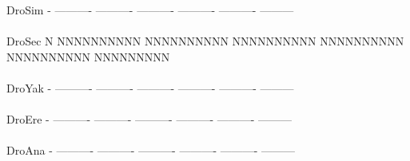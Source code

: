 \documentclass[11pt,twoside,reqno,a4paper]{article}
\begin{document}
{DroSim	-	----------	----------	----------	----------	----------	---------\\
\hspace*{7\charwidth}\hspace*{1\charwidth}\hspace*{1\charwidth}\hspace*{1\charwidth}\hspace*{1\charwidth}\hspace*{1\charwidth}\hspace*{1\charwidth}\\
DroSec	N	NNNNNNNNNN	NNNNNNNNNN	NNNNNNNNNN	NNNNNNNNNN	NNNNNNNNNN	NNNNNNNNN\\
\hspace*{7\charwidth}\hspace*{1\charwidth}\hspace*{1\charwidth}\hspace*{1\charwidth}\hspace*{1\charwidth}\hspace*{1\charwidth}\hspace*{1\charwidth}\\
DroYak	-	----------	----------	----------	----------	----------	---------\\
\hspace*{7\charwidth}\hspace*{1\charwidth}\hspace*{1\charwidth}\hspace*{1\charwidth}\hspace*{1\charwidth}\hspace*{1\charwidth}\hspace*{1\charwidth}\\
DroEre	-	----------	----------	----------	----------	----------	---------\\
\hspace*{7\charwidth}\hspace*{1\charwidth}\hspace*{1\charwidth}\hspace*{1\charwidth}\hspace*{1\charwidth}\hspace*{1\charwidth}\hspace*{1\charwidth}\\
DroAna	-	----------	----------	----------	----------	----------	---------\\
\hspace*{7\charwidth}\hspace*{1\charwidth}\hspace*{1\charwidth}\hspace*{1\charwidth}\hspace*{1\charwidth}\hspace*{1\charwidth}\hspace*{1\charwidth}\\
}
\end{document}
